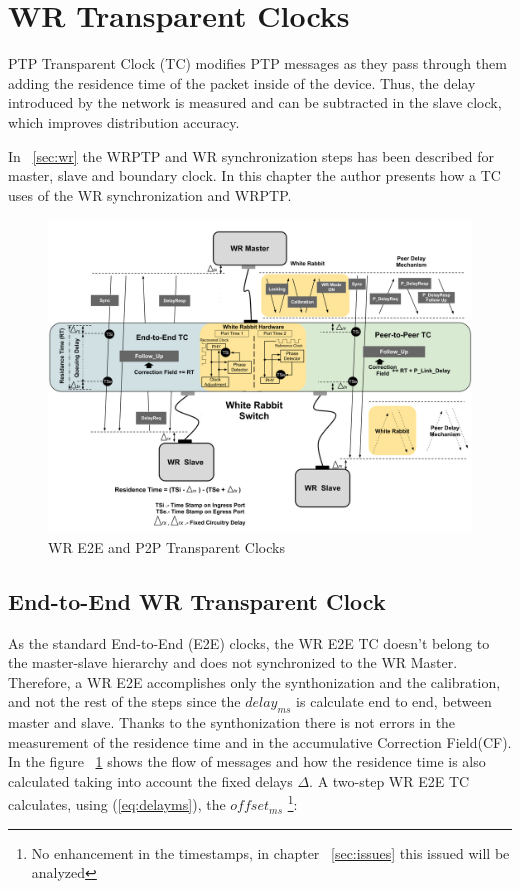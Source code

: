 \section{WR Transparent Clocks}
\label{sec:wr_tc}
PTP Transparent Clock (TC) modifies PTP messages as they pass through them
adding the residence time of the packet inside of the device. Thus, the delay
introduced  by the network is measured and can be subtracted in the slave clock, 
which improves distribution accuracy.

In ~\ref{sec:wr} the WRPTP and WR synchronization steps has been described for
master, slave and boundary clock. In this chapter the author presents how a TC
uses of the WR synchronization and WRPTP.

\begin{figure}[!t]
\centering
\includegraphics[scale=0.27]{fig/wr_schema_hw_bw.png}
\caption{WR E2E and P2P Transparent Clocks}
\label{fig:wr_tc}
\end{figure}

\subsection{End-to-End WR Transparent Clock}

As the standard End-to-End (E2E) clocks, the WR E2E TC doesn't belong to the
master-slave hierarchy and does not synchronized to the WR Master. 
Therefore, a WR E2E accomplishes only the synthonization and the calibration,
and not the rest of the steps since the $delay_{ms}$ is calculate end to end,
between master and slave. Thanks to the synthonization there is not errors in
the measurement of the residence time and in the accumulative Correction
Field(CF). In the figure ~\ref{fig:wr_tc} shows the
flow of messages and how the residence time is also calculated taking into account 
the fixed delays $\Delta$. A two-step WR E2E TC calculates, using
(\ref{eq:delayms}), the $offset_{ms}$ \footnote{No enhancement in the timestamps, in chapter
~\ref{sec:issues} this issued will be analyzed}:

